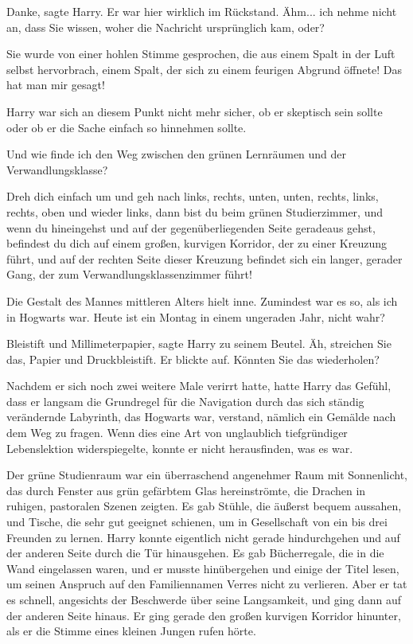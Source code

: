\glqq{}Danke\grqq{}, sagte Harry. Er war hier wirklich im Rückstand. \glqq{}Ähm...
ich nehme nicht an, dass Sie wissen, woher die Nachricht ursprünglich kam,
oder?\grqq{}

\glqq{}Sie wurde von einer hohlen Stimme gesprochen, die aus einem Spalt in der
Luft selbst hervorbrach, einem Spalt, der sich zu einem feurigen Abgrund
öffnete! Das hat man mir gesagt!\grqq{}

Harry war sich an diesem Punkt nicht mehr sicher, ob er skeptisch sein sollte
oder ob er die Sache einfach so hinnehmen sollte.

\glqq{}Und wie finde ich den Weg zwischen den grünen Lernräumen und der
Verwandlungsklasse?\grqq{}

\glqq{}Dreh dich einfach um und geh nach links, rechts, unten, unten, rechts,
links, rechts, oben und wieder links, dann bist du beim grünen Studierzimmer,
und wenn du hineingehst und auf der gegenüberliegenden Seite geradeaus gehst,
befindest du dich auf einem großen, kurvigen Korridor, der zu einer Kreuzung
führt, und auf der rechten Seite dieser Kreuzung befindet sich ein langer,
gerader Gang, der zum Verwandlungsklassenzimmer führt!\grqq{}

Die Gestalt des Mannes mittleren Alters hielt inne. \glqq{}Zumindest war es so,
als ich in Hogwarts war. Heute ist ein Montag in einem ungeraden Jahr, nicht
wahr?\grqq{}

\glqq{}Bleistift und Millimeterpapier\grqq{}, sagte Harry zu seinem Beutel. \glqq
Äh, streichen Sie das, Papier und Druckbleistift.\grqq{} Er blickte auf. \glqq
Könnten Sie das wiederholen?\grqq{}

Nachdem er sich noch zwei weitere Male verirrt hatte, hatte Harry das Gefühl,
dass er langsam die Grundregel für die Navigation durch das sich ständig
verändernde Labyrinth, das Hogwarts war, verstand, nämlich ein Gemälde nach dem
Weg zu fragen. Wenn dies eine Art von unglaublich tiefgründiger Lebenslektion
widerspiegelte, konnte er nicht herausfinden, was es war.

Der grüne Studienraum war ein überraschend angenehmer Raum mit Sonnenlicht, das
durch Fenster aus grün gefärbtem Glas hereinströmte, die Drachen in ruhigen,
pastoralen Szenen zeigten. Es gab Stühle, die äußerst bequem aussahen, und
Tische, die sehr gut geeignet schienen, um in Gesellschaft von ein bis drei
Freunden zu lernen. Harry konnte eigentlich nicht gerade hindurchgehen und auf
der anderen Seite durch die Tür hinausgehen. Es gab Bücherregale, die in die
Wand eingelassen waren, und er musste hinübergehen und einige der Titel lesen,
um seinen Anspruch auf den Familiennamen Verres nicht zu verlieren. Aber er tat
es schnell, angesichts der Beschwerde über seine Langsamkeit, und ging dann auf
der anderen Seite hinaus. Er ging gerade den \glqq{}großen kurvigen
Korridor\grqq{} hinunter, als er die Stimme eines kleinen Jungen rufen hörte.

